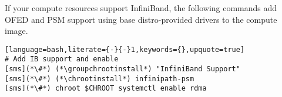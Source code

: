 If your compute resources support InfiniBand, the following commands add OFED
and PSM support using base distro-provided drivers to the compute
image. 

\begin{lstlisting}[language=bash,literate={-}{-}1,keywords={},upquote=true]
# Add IB support and enable
[sms](*\#*) (*\groupchrootinstall*) "InfiniBand Support"
[sms](*\#*) (*\chrootinstall*) infinipath-psm
[sms](*\#*) chroot $CHROOT systemctl enable rdma
\end{lstlisting}

